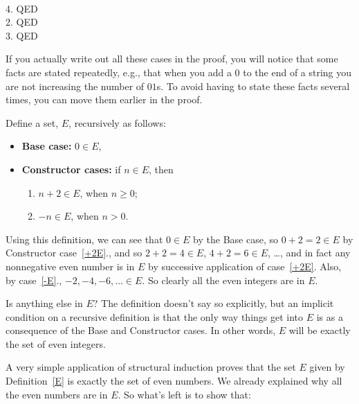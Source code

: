 \begin{definition}
{ \\
  4. QED 
   \\
  2. QED
   \\
  3. QED 
  \\
}

If you actually write out all these cases in the proof, you will
notice that some facts are stated repeatedly, e.g., that when you add
a $0$ to the end of a string you are not increasing the number of
$01$s.  To avoid having to state these facts several times, you can
move them earlier in the proof.
\fi


\iffalse

\begin{example*}
\begin{definition}\label{E}
Define a set, $E$, recursively as follows:
\begin{itemize}
\item \textbf{Base case:} $0 \in E$,\label{0E}
\item \textbf{Constructor cases:} if $n \in E$, then
\begin{enumerate}
\item $n+2 \in E$, when $n\geq 0$;\label{+2E}
\item $-n \in E$, when $n > 0$.\label{-E}
\end{enumerate}
\end{itemize}

\end{definition}
\end{example*}

Using this definition, we can see that $0 \in E$ by the Base case, so $0 +
2 = 2 \in E$ by Constructor case~\ref{+2E}., and so $2+2 =4 \in E$, $4+2 =
6 \in E$, \dots, and in fact any nonnegative even number is in $E$ by
successive application of case~\ref{+2E}.  Also, by case~\ref{-E}.,
$-2,-4,-6,\dots \in E$.  So clearly all the even integers are in $E$.

Is anything else in $E$?  The definition doesn't say so explicitly, but an
implicit condition on a recursive definition is that the only way things
get into $E$ is as a consequence of the Base and Constructor cases.  In
other words, $E$ will be exactly the set of even integers.

A very simple application of structural induction proves that the set $E$
given by Definition~\ref{E} is exactly the set of even numbers.  We already
explained why all the even numbers are in $E$.  So what's left is to show
that:


\end{definition}
